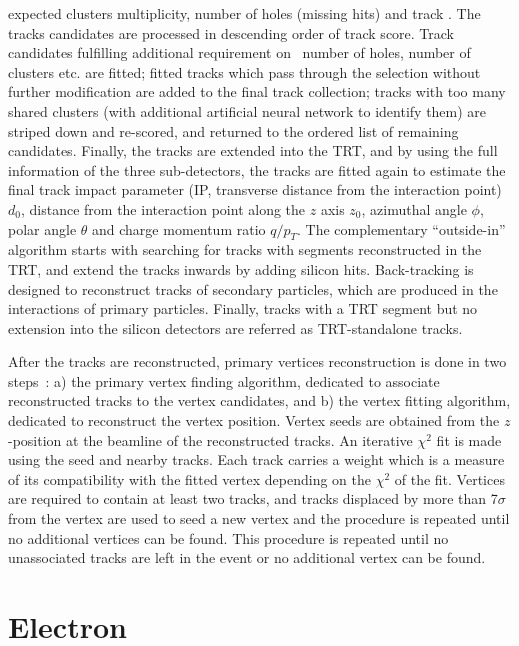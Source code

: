 expected clusters multiplicity, number of holes (missing hits) and track \pt. 
The tracks candidates are processed in descending order of 
track score. Track candidates fulfilling additional requirement 
on \pt\, number of holes, number of clusters etc. are fitted;
fitted tracks which pass through the selection without further modification
are added to the final track collection; tracks with too many shared clusters 
(with additional artificial neural network to identify them) are striped down and re-scored, 
and returned to the ordered list of remaining candidates. 
Finally, the tracks are extended into the TRT, and by using the full information
of the three sub-detectors, the tracks are fitted again to estimate the final track
impact parameter (IP, transverse distance from the interaction point) $d_0$, 
distance from the interaction point along the $z$ axis $z_0$,
azimuthal angle $\phi$, polar angle $\theta$ and charge momentum ratio $q/p_T$.
The complementary ``outside-in'' algorithm starts with searching for tracks with segments 
reconstructed in the TRT, and extend the tracks inwards by adding silicon hits. 
Back-tracking is designed to reconstruct tracks of secondary particles, which are
produced in the interactions of primary particles.
Finally, tracks with a TRT segment but no extension into the silicon detectors
are referred as TRT-standalone tracks. 

After the tracks are reconstructed, primary vertices reconstruction is done in two steps~\cite{ATLAS-CONF-2010-069}:
a) the primary vertex finding algorithm, dedicated to associate reconstructed tracks to the vertex candidates, 
and b) the vertex fitting algorithm, dedicated to reconstruct the vertex position. 
Vertex seeds are obtained from the $z$-position at the beamline of the reconstructed tracks. 
An iterative $\chi^2$ fit is made using the seed and nearby tracks. 
Each track carries a weight which is a measure of its compatibility 
with the fitted vertex depending on the $\chi^2$ of the fit. 
Vertices are required to contain at least two tracks, and 
tracks displaced by more than 7$\sigma$ from the vertex are used to
seed a new vertex and the procedure is repeated until no additional vertices can be found. 
This procedure is repeated until no unassociated tracks are left in the event or no
additional vertex can be found. 




\section{Electron}

